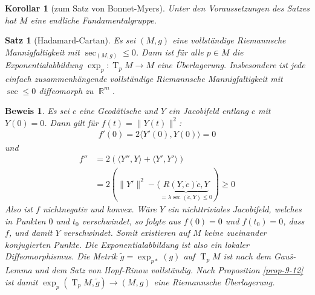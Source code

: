 \documentclass[paper=A4, twoside, chapterprefix=true, bibliography=totoc, headsepline]{scrbook}
\DeclareMathOperator{\R}{\mathbb{R}}
\DeclareMathOperator{\T}{T}         %
\theoremstyle{plain}
\newtheorem{Satz}[Dfn]{Satz}
\theoremstyle{nonumberplain}
\newtheorem{kor}{Korollar}
\newtheorem{bew}{Beweis}
\theoremstyle{empty}
\theoremstyle{break}
\begin{document}
\begin{kor}[zum Satz von Bonnet-Myers]
  Unter den Voraussetzungen des Satzes hat $M$ eine endliche Fundamentalgruppe.
\end{kor}

\begin{Satz}[Hadamard-Cartan]
  Es sei $(M,g)$ eine vollst\"andige Riemannsche Mannigfaltigkeit mit $\sec_{(M,g)} \le 0$. Dann ist f\"ur alle $p \in M$ die Exponentialabbildung $\exp_p: \T_pM \to M$ eine \"Uberlagerung.
  Insbesondere ist jede einfach zusammenh\"angende vollst\"andige Riemannsche Mannigfaltigkeit mit $\sec \le 0$ diffeomorph zu $\R^m$.
\end{Satz}

\begin{bew}
  Es sei $c$ eine Geod\"atische und $Y$ ein Jacobifeld entlang $c$ mit $Y(0) = 0$. Dann gilt f\"ur $f(t) = \|Y(t)\|^2$:
  \begin{align*}
    f'(0) = 2 \langle Y'(0), Y(0) \rangle = 0
  \end{align*}
  und
  \begin{align*}
    f'' &= 2 (\langle Y'', Y \rangle + \langle Y', Y' \rangle)\\
    &= 2 (\|Y'\|^2 - \langle \underbrace{R(Y, \dot c) \dot c, Y}_{=\lambda\sec(\dot c, Y) \le 0}) \ge 0
  \end{align*}
  Also ist $f$ nichtnegativ und konvex. W\"are $Y$ ein nichttriviales Jacobifeld, welches in Punkten $0$ und $t_0$ verschwindet, so folgte aus $f(0) = 0$ und $f(t_0) = 0$, dass $f$, und damit $Y$ verschwindet.
  Somit existieren auf $M$ keine zueinander konjugierten Punkte.
  Die Exponentialabbildung ist also ein lokaler Diffeomorphismus.
  Die Metrik $\tilde g = \exp_{p*}(g)$ auf $\T_pM$ ist nach dem Gau\"s-Lemma und dem Satz von Hopf-Rinow vollst\"andig.
  Nach Proposition \ref{prop-9-12} ist damit $\exp_p(\T_pM, \tilde g) \to (M,g)$ eine Riemannsche \"Uberlagerung.
\end{bew}
\end{document}
